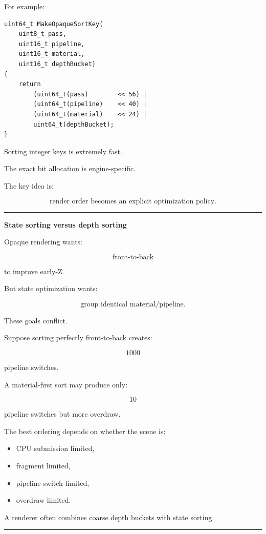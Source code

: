 For example:

\begin{verbatim}
uint64_t MakeOpaqueSortKey(
    uint8_t pass,
    uint16_t pipeline,
    uint16_t material,
    uint16_t depthBucket)
{
    return
        (uint64_t(pass)        << 56) |
        (uint64_t(pipeline)    << 40) |
        (uint64_t(material)    << 24) |
        uint64_t(depthBucket);
}
\end{verbatim}

Sorting integer keys is extremely fast.

The exact bit allocation is engine-specific.

The key idea is:

\[
\boxed{
\text{render order becomes an explicit optimization policy}.
}
\]

\begin{center}\rule{0.5\linewidth}{0.5pt}\end{center}

\textbf{State sorting versus depth sorting}

Opaque rendering wants:

\[
\text{front-to-back}
\]

to improve early-Z.

But state optimization wants:

\[
\text{group identical material/pipeline}.
\]

These goals conflict.

Suppose sorting perfectly front-to-back creates:

\[
1000
\]

pipeline switches.

A material-first sort may produce only:

\[
10
\]

pipeline switches but more overdraw.

The best ordering depends on whether the scene is:

\begin{itemize}
\tightlist
\item
  CPU submission limited,
\item
  fragment limited,
\item
  pipeline-switch limited,
\item
  overdraw limited.
\end{itemize}

A renderer often combines coarse depth buckets with state sorting.

\begin{center}\rule{0.5\linewidth}{0.5pt}\end{center}

